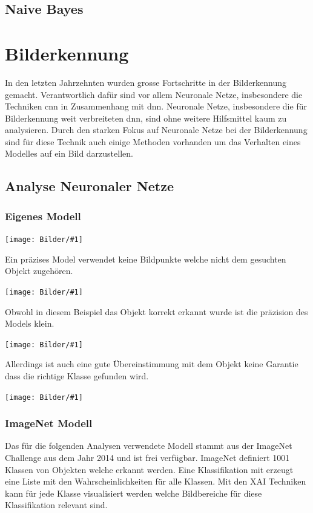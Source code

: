 \documentclass[
  12pt, %
  a4paper, %
  oneside, %
  openany, 
  numbers=noenddot, %
  BCOR=5mm, %
  parskip=half*, %
  thesis, %
]{bfhbook}
\newcommand{\imgText}[2]{
\begin{center}
    \begin{minipage}[t]{0.6\textwidth}
    		\vspace{0pt}
		\texttt{[image: Bilder/\#1]}
	\end{minipage}\hfill
    \begin{minipage}[t]{0.4\textwidth}
    		\vspace{0pt}
  		#2
    \end{minipage}
\end{center}
}
\begin{document}
\subsection{Naive Bayes}

\section{Bilderkennung}
In den letzten Jahrzehnten wurden grosse Fortschritte in der Bilderkennung gemacht. Verantwortlich dafür sind vor allem Neuronale Netze, insbesondere die Techniken \acrfull{cnn} in Zusammenhang mit {dnn}. Neuronale Netze, insbesondere die für Bilderkennung weit verbreiteten \acrfull{dnn}, sind ohne weitere Hilfsmittel kaum zu analysieren.
Durch den starken Fokus auf Neuronale Netze bei der Bilderkennung sind für diese Technik auch einige Methoden vorhanden um das Verhalten eines Modelles  auf ein Bild darzustellen.
\subsection{Analyse Neuronaler Netze}
\subsubsection*{Eigenes Modell}
\imgText{dog-good-heatmap.png}{ 
Ein präzises Model verwendet keine Bildpunkte welche nicht dem gesuchten Objekt zugehören.
}

\imgText{dog-bad-heatmap.png}{ 
Obwohl in diesem Beispiel das Objekt korrekt erkannt wurde ist die präzision des Models klein.
}

\imgText{cat-good-heatmap.png}{ 
Allerdings ist auch eine gute Übereinstimmung mit dem Objekt keine Garantie dass die richtige Klasse gefunden wird.
}

\imgText{cat-bad-heatmap.png}{ 

}
\subsubsection*{ImageNet Modell}
Das für die folgenden Analysen verwendete Modell \parencite{Simonyan2014} stammt aus der ImageNet Challenge \cite{imageNet} aus dem Jahr 2014 und ist frei verfügbar. ImageNet definiert 1001 Klassen von Objekten welche erkannt werden. Eine Klassifikation mit \cite{TensorFlow} erzeugt eine Liste mit den Wahrscheinlichkeiten für alle Klassen. Mit den \acrfull{XAI} Techniken kann für jede Klasse visualisiert werden welche Bildbereiche für diese Klassifikation relevant sind.
\end{document}
